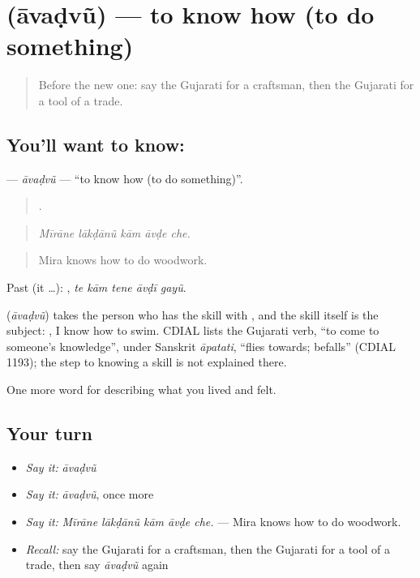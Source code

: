 \section[\texorpdfstring{\gu{આવડવું} (āvaḍvũ)}{આવડવું (āvaḍvũ)}]{ (āvaḍvũ) — to know how (to do something)}

\label{lesson:GU-C501-avadvu}



\begin{quote}
Before the new one: say the Gujarati for a craftsman, then the Gujarati for a tool of a trade.
\end{quote}

\subsection*{You'll want to know: }
\textbf{} — \emph{āvaḍvũ} — \textquotedblleft{}to know how (to do something)\textquotedblright{}.

\begin{quote}
    .
\end{quote}

\begin{quote}
\emph{Mīrāne lākḍānũ kām āvḍe che.}
\end{quote}

\begin{quote}
Mira knows how to do woodwork.
\end{quote}

Past (it …):     , \emph{te kām tene āvḍī gayũ}.

\begin{cousinweb}
\textbf{} (\emph{āvaḍvũ}) takes the person who has the skill with \textbf{}, and the skill itself is the subject: \textbf{   }, I know how to swim. CDIAL lists the Gujarati verb, \textquotedblleft{}to come to someone's knowledge\textquotedblright{}, under Sanskrit \emph{āpatati}, \textquotedblleft{}flies towards; befalls\textquotedblright{} (CDIAL 1193); the step to knowing a skill is not explained there.
\end{cousinweb}

\begin{grammarlens}[title={What you've built}]
One more word for describing what you lived and felt.
\end{grammarlens}

\subsection*{Your turn}
\begin{itemize}
\raggedright
  \item \emph{Say it:} \emph{āvaḍvũ}
  \item \emph{Say it:} \emph{āvaḍvũ}, once more
  \item \emph{Say it:} \emph{Mīrāne lākḍānũ kām āvḍe che.} — Mira knows how to do woodwork.
  \item \emph{Recall:} say the Gujarati for a craftsman, then the Gujarati for a tool of a trade, then say \emph{āvaḍvũ} again
\end{itemize}

